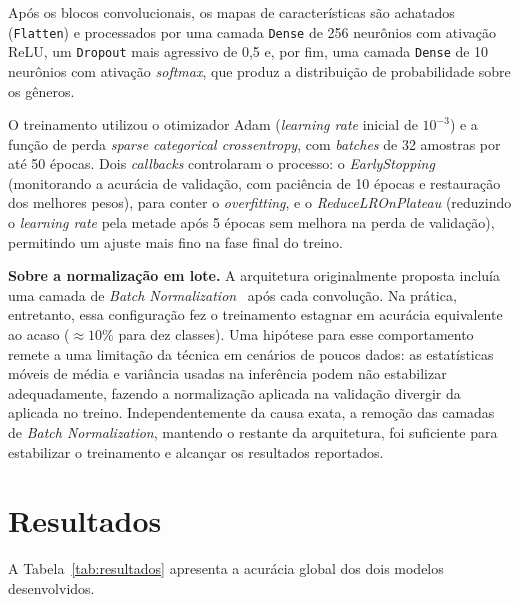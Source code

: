 \documentclass[conference]{IEEEtran}
\begin{document}
	Após os blocos convolucionais, os mapas de características são achatados (\texttt{Flatten}) e processados por uma camada \texttt{Dense} de 256 neurônios com ativação ReLU, um \texttt{Dropout} mais agressivo de 0,5 e, por fim, uma camada \texttt{Dense} de 10 neurônios com ativação \textit{softmax}, que produz a distribuição de probabilidade sobre os gêneros.
	
	O treinamento utilizou o otimizador Adam (\textit{learning rate} inicial de $10^{-3}$) e a função de perda \textit{sparse categorical crossentropy}, com \textit{batches} de 32 amostras por até 50 épocas. Dois \textit{callbacks} controlaram o processo: o \textit{EarlyStopping} (monitorando a acurácia de validação, com paciência de 10 épocas e restauração dos melhores pesos), para conter o \textit{overfitting}, e o \textit{ReduceLROnPlateau} (reduzindo o \textit{learning rate} pela metade após 5 épocas sem melhora na perda de validação), permitindo um ajuste mais fino na fase final do treino.
	
	\textbf{Sobre a normalização em lote.} A arquitetura originalmente proposta incluía uma camada de \textit{Batch Normalization}~\cite{ioffe2015} após cada convolução. Na prática, entretanto, essa configuração fez o treinamento estagnar em acurácia equivalente ao acaso ($\approx 10\%$ para dez classes). Uma hipótese para esse comportamento remete a uma limitação da técnica em cenários de poucos dados: as estatísticas móveis de média e variância usadas na inferência podem não estabilizar adequadamente, fazendo a normalização aplicada na validação divergir da aplicada no treino. Independentemente da causa exata, a remoção das camadas de \textit{Batch Normalization}, mantendo o restante da arquitetura, foi suficiente para estabilizar o treinamento e alcançar os resultados reportados.
	
	\section{Resultados}
	
	A Tabela~\ref{tab:resultados} apresenta a acurácia global dos dois modelos desenvolvidos. 
	
\end{document}
